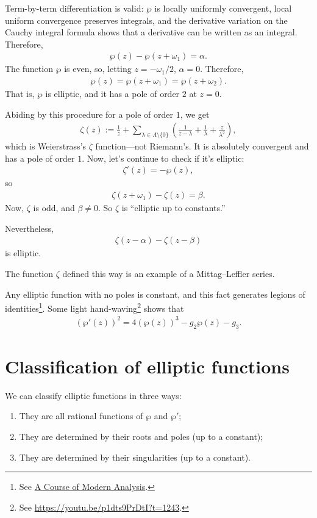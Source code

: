 \documentclass[11pt, oneside,margin=1in]{article}
\begin{document}
Term-by-term differentiation is valid: $\wp$ is locally uniformly convergent, local uniform convergence preserves integrals, and the derivative variation on the Cauchy integral formula shows that a derivative can be written as an integral. Therefore, 
\begin{align*}
	\wp(z) - \wp (z+\omega_1) = \alpha.
\end{align*}
The function $\wp$ is even, so, letting $z=-\omega_1/2$, $\alpha = 0$. Therefore,
\begin{align*}
	\wp(z) = \wp (z+\omega_1) = \wp(z+\omega_2).
\end{align*}
That is, $\wp$ is elliptic, and it has a pole of order $2$ at $z=0$. 

Abiding by this procedure for a pole of order $1$, we get
\begin{align*}
	\zeta(z) :=  \frac{1}{z} + \sum_{\lambda\in \Lambda\setminus\{0\}}^{} \left( \frac{1}{z-\lambda}+ \frac{1}{\lambda} + \frac{z}{\lambda^2} \right), 
\end{align*}
which is Weierstrass's $\zeta$ function---not Riemann's. It is absolutely convergent and has a pole of order $1$. Now, let's continue to check if it's elliptic:
\begin{align*}
	\zeta'(z) = -\wp (z),
\end{align*}
so 
\begin{align*}
	\zeta(z+\omega_1) - \zeta(z) = \beta.
\end{align*}
Now, $\zeta$ is odd, and $\beta\ne 0$. So $\zeta$ is ``elliptic up to constants.''

Nevertheless, 
\begin{align*}
	\zeta(z-\alpha) - \zeta (z-\beta)
\end{align*} 
is elliptic. 

The function $\zeta$ defined this way is an example of a Mittag--Leffler series.

Any elliptic function with no poles is constant, and this fact generates legions of identities\footnote{See \underline{A Course of Modern Analysis}.}. Some light hand-waving\footnote{See \url{https://youtu.be/p1dts9PrDtI?t=1243}.} shows that
\begin{align*}
	(\wp'(z)) ^2 = 4(\wp(z)) ^3 - g_2\wp(z) -  g_3.
\end{align*}

\section{Classification of elliptic functions}
We can classify elliptic functions in three ways:
\begin{enumerate}
	\item They are all rational functions of $\wp$ and $\wp'$;
	\item They are determined by their roots and poles (up to a constant); 
	\item They are determined by their singularities (up to a constant).
\end{enumerate}
\end{document}
